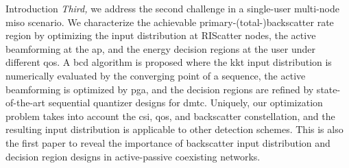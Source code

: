 \documentclass[journal]{IEEEtran}
\begin{document}
\begin{section}{Introduction}
	\emph{Third,} we address the second challenge in a single-user multi-node \gls{miso} scenario.
	We characterize the achievable primary-(total-)backscatter rate region by optimizing the input distribution at RIScatter nodes, the active beamforming at the \gls{ap}, and the energy decision regions at the user under different \gls{qos}.
	A \gls{bcd} algorithm is proposed where the \gls{kkt} input distribution is numerically evaluated by the converging point of a sequence, the active beamforming is optimized by \gls{pga}, and the decision regions are refined by state-of-the-art sequential quantizer designs for \gls{dmtc}.
	Uniquely, our optimization problem takes into account the \gls{csi}, \gls{qos}, and backscatter constellation, and the resulting input distribution is applicable to other detection schemes.
	This is also the first paper to reveal the importance of backscatter input distribution and decision region designs in active-passive coexisting networks.



\end{section}
\end{document}
